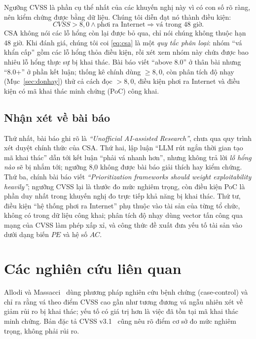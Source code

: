 \documentclass[conference]{IEEEtran}
\begin{document}
Ngưỡng CVSS là phần cụ thể nhất của các khuyến nghị này vì có con số rõ ràng, nên kiểm chứng
được bằng dữ liệu. Chúng tôi diễn đạt nó thành điều kiện:
\begin{equation}
\mathit{CVSS} > 8{,}0 \wedge \text{phơi ra Internet} \Longrightarrow \text{vá trong 48 giờ}.
\label{eq:csa}
\end{equation}
CSA không nói các lỗ hổng còn lại được bỏ qua, chỉ nói chúng không thuộc hạn 48 giờ. Khi đánh
giá, chúng tôi coi \eqref{eq:csa} là một \emph{quy tắc phân loại}: nhóm ``vá khẩn cấp'' gồm các lỗ hổng thỏa điều kiện, rồi xét xem nhóm này chứa được bao nhiêu lỗ hổng thực sự bị khai thác. Bài
báo viết ``above 8.0'' ở thân bài nhưng ``8.0+'' ở phần kết luận; thống kê chính dùng $\ge 8{,}0$,
còn phân tích độ nhạy (Mục~\ref{sec:donhay}) thử cả cách đọc $> 8{,}0$, điều kiện phơi ra
Internet và điều kiện có mã khai thác minh chứng (PoC) công khai.

\subsection{Nhận xét về bài báo}
Thứ nhất, bài báo ghi rõ là \emph{``Unofficial AI-assisted Research''}, chưa qua quy trình xét
duyệt chính thức của CSA. Thứ hai, lập luận ``LLM rút ngắn thời gian tạo mã khai thác'' dẫn tới
kết luận ``phải vá nhanh hơn'', nhưng không trả lời \emph{lỗ hổng nào} sẽ bị nhắm tới; ngưỡng 8,0
không được bài báo giải thích hay kiểm chứng. Thứ ba, chính bài báo viết \emph{``Prioritization
frameworks should weight exploitability heavily''}; ngưỡng CVSS lại là thước đo mức nghiêm trọng,
còn điều kiện PoC là phần duy nhất trong khuyến nghị đo trực tiếp khả năng bị khai thác. Thứ tư,
điều kiện ``hệ thống phơi ra Internet'' phụ thuộc vào tài sản của từng tổ chức, không có trong dữ
liệu công khai; phân tích độ nhạy dùng vector tấn công qua mạng của CVSS làm phép xấp xỉ, và công thức đề xuất đưa yếu tố tài sản vào dưới dạng biến $\mathit{PE}$ và hệ số $AC$.

\section{Các nghiên cứu liên quan}\label{sec:lienquan}

Allodi và Massacci~\cite{allodi2014} dùng phương pháp nghiên cứu bệnh chứng (case-control) và chỉ ra rằng vá
theo điểm CVSS cao gần như tương đương vá ngẫu nhiên xét về giảm rủi ro bị khai thác; yếu tố có
giá trị hơn là việc đã tồn tại mã khai thác minh chứng. Bản đặc tả CVSS v3.1~\cite{cvss31} cũng
nêu rõ điểm cơ sở đo mức nghiêm trọng, không phải rủi ro.
\end{document}
